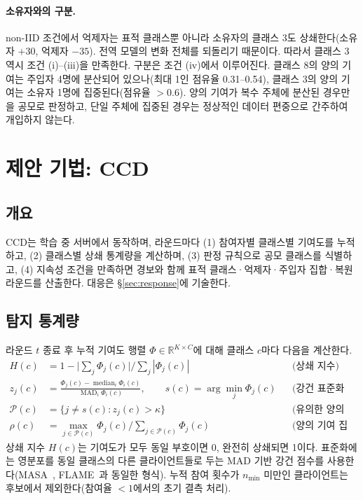 \documentclass[10pt,a4paper]{article}
\newcommand{\method}{CCD}
\begin{document}
\paragraph{소유자와의 구분.} non-IID 조건에서 억제자는 표적 클래스뿐 아니라 소유자의 클래스 3도 상쇄한다(소유자 $+30$, 억제자 $-35$). 전역 모델의 변화 전체를 되돌리기 때문이다. 따라서 클래스 3 역시 조건 (i)--(iii)을 만족한다. 구분은 조건 (iv)에서 이루어진다. 클래스 8의 양의 기여는 주입자 4명에 분산되어 있으나(최대 1인 점유율 0.31--0.54), 클래스 3의 양의 기여는 소유자 1명에 집중된다(점유율 $>0.6$). 양의 기여가 복수 주체에 분산된 경우만을 공모로 판정하고, 단일 주체에 집중된 경우는 정상적인 데이터 편중으로 간주하여 개입하지 않는다.

\section{제안 기법: \method{}}\label{sec:method}
\subsection{개요}
\method{}는 학습 중 서버에서 동작하며, 라운드마다 (1) 참여자별 클래스별 기여도를 누적하고, (2) 클래스별 상쇄 통계량을 계산하며, (3) 판정 규칙으로 공모 클래스를 식별하고, (4) 지속성 조건을 만족하면 경보와 함께 표적 클래스·억제자·주입자 집합·복원 라운드를 산출한다. 대응은 \S\ref{sec:response}에 기술한다.

\subsection{탐지 통계량}
라운드 $t$ 종료 후 누적 기여도 행렬 $\Phi\in\mathbb{R}^{K\times C}$에 대해 클래스 $c$마다 다음을 계산한다.
\begin{align}
H(c)&=1-\Big|\sum_j\Phi_j(c)\Big|\Big/\sum_j|\Phi_j(c)| &&\text{(상쇄 지수)}\\
z_j(c)&=\frac{\Phi_j(c)-\operatorname{median}_i\Phi_i(c)}{\operatorname{MAD}_i\Phi_i(c)},\qquad s(c)=\arg\min_j\Phi_j(c) &&\text{(강건 표준화 점수, 최소 기여 클라이언트)}\\
\mathcal{P}(c)&=\{j\neq s(c): z_j(c)>\kappa\} &&\text{(유의한 양의 기여 집합)}\\
\rho(c)&=\max_{j\in\mathcal{P}(c)}\Phi_j(c)\Big/\sum_{j\in\mathcal{P}(c)}\Phi_j(c) &&\text{(양의 기여 집중도)}
\end{align}
상쇄 지수 $H(c)$는 기여도가 모두 동일 부호이면 0, 완전히 상쇄되면 1이다. 표준화에는 영분포를 동일 클래스의 다른 클라이언트들로 두는 MAD 기반 강건 점수를 사용한다(MASA~\cite{masa}, FLAME~\cite{flame}과 동일한 형식). 누적 참여 횟수가 $n_{\min}$ 미만인 클라이언트는 후보에서 제외한다(참여율 $<1$에서의 초기 결측 처리).
\end{document}
